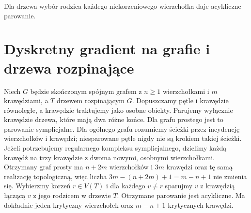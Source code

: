 \begin{samepage}
\begin{center}
\begin{minipage}{.96\linewidth}\centering
{}\par\smallskip

{\footnotesize Dla drzewa wybór rodzica każdego niekorzeniowego
wierzchołka daje acykliczne parowanie.}
\end{minipage}
\end{center}
\end{samepage}

\section{Dyskretny gradient na grafie i drzewa rozpinające}
\label{sec:tg-forman-on-graph}

\begin{twierdzenie}
\label{thm:tg-forman-tree}
Niech $G$ będzie skończonym spójnym grafem z $n\ge1$
wierzchołkami i $m$ krawędziami, a $T$ drzewem
rozpinającym $G$. Dopuszczamy pętle i krawędzie równoległe, a krawędzie
traktujemy jako osobne obiekty. Parujemy wyłącznie
krawędzie drzewa, które mają dwa różne końce.
Dla grafu prostego jest to parowanie symplicjalne.
Dla ogólnego grafu rozumiemy ścieżki przez incydencję
wierzchołków i krawędzi; niesparowane pętle nigdy
nie są krokiem takiej ścieżki. Jeżeli potrzebujemy
regularnego kompleksu symplicjalnego, dzielimy
każdą krawędź na trzy krawędzie z dwoma nowymi,
osobnymi wierzchołkami. Otrzymany graf prosty ma
$n+2m$ wierzchołków i $3m$ krawędzi oraz tę samą
realizację topologiczną, więc liczba
$3m-(n+2m)+1=m-n+1$ nie zmienia się.
Wybierzmy korzeń $r\in V(T)$ i dla każdego $v\ne r$
sparujmy $v$ z krawędzią łączącą $v$ z jego rodzicem
w drzewie $T$. Otrzymane parowanie jest acykliczne.
Ma dokładnie jeden krytyczny wierzchołek oraz
$m-n+1$ krytycznych krawędzi.
\end{twierdzenie}

